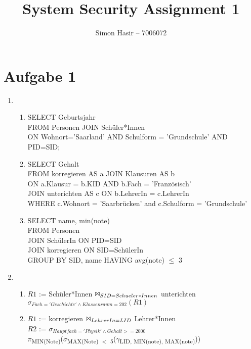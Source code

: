 \documentclass[12pt]{article}
\title{System Security Assignment 1}
\author{Simon Hasir -- 7006072}
\begin{document}
    \maketitle
    \section*{Aufgabe 1}
    \begin{enumerate}[label=(\alph*)]
    \item \begin{enumerate}[label=(\roman*)]
        \item SELECT Geburtsjahr \\
        FROM Personen JOIN Schüler*Innen \\
        ON Wohnort='Saarland' AND Schulform = 'Grundschule' AND PID=SID;
        \item SELECT Gehalt\\
        FROM korregieren AS a JOIN Klausuren AS b\\
         ON a.Klausur = b.KID AND b.Fach = 'Französisch'\\
        JOIN unterichten AS c ON b.LehrerIn = c.LehrerIn \\
        WHERE c.Wohnort = 'Saarbrücken' and c.Schulform = 'Grundschule'
        \item SELECT name, min(note) \\
        FROM Personen\\
        JOIN SchülerIn ON PID=SID \\
        JOIN korregieren ON  SID=SchülerIn\\
        GROUP BY SID, name HAVING avg(note) $\le$ 3 
    \end{enumerate} %
    \item \begin{enumerate}[label=(\roman*)]
        \item $R1$ := Schüler*Innen $\Bowtie _{SID= Schueler*Innen}$ unterichten\\
        $\sigma_{Fach='Geschichte' \land Klassenraum=202} (R1)$
        \item $R1$ := korregieren $\Bowtie_{LehrerIn=LID}$ Lehrer*Innen\\
        $R2$ := $\sigma_{Hauptfach='Physik' \land Gehalt>= 2000}$\\
        $\pi$\textsubscript{MIN(Note)}($\sigma$\textsubscript{MAX(Note) $<$ 5}($\gamma$\textsubscript{LID, MIN(note), MAX(note)}))
    \end{enumerate}
    \end{enumerate}
\end{document}
